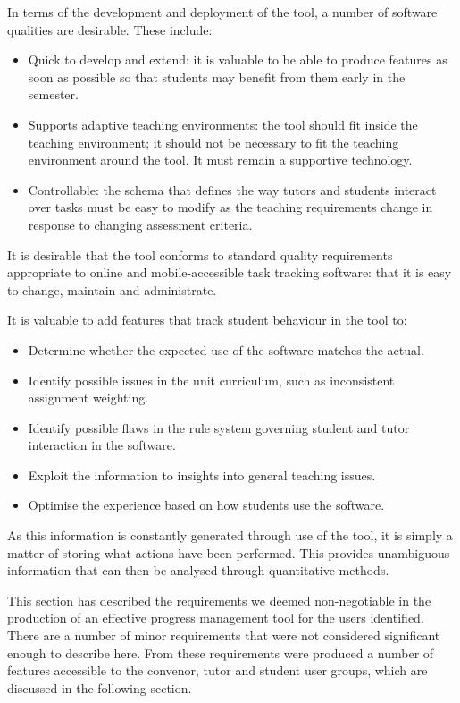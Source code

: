 In terms of the development and deployment of the tool, a number of software qualities are desirable. These include:
\begin{itemize}
  \item Quick to develop and extend: it is valuable to be able to produce features as soon as possible so that students may benefit from them early in the semester.
  \item Supports adaptive teaching environments: the tool should fit inside the teaching environment; it should not be necessary to fit the teaching environment around the tool. It must remain a supportive technology.
  \item Controllable: the schema that defines the way tutors and students interact over tasks must be easy to modify as the teaching requirements change in response to changing assessment criteria.
\end{itemize}
It is desirable that the tool conforms to standard quality requirements appropriate to online and mobile-accessible task tracking software: that it is easy to change, maintain and administrate.

It is valuable to add features that track student behaviour in the tool to:
\begin{itemize}
  \item Determine whether the expected use of the software matches the actual.
  \item Identify possible issues in the unit curriculum, such as inconsistent assignment weighting.
  \item Identify possible flaws in the rule system governing student and tutor interaction in the software.
  \item Exploit the information to insights into general teaching issues.
  \item Optimise the experience based on how students use the software.
\end{itemize}
As this information is constantly generated through use of the tool, it is simply a matter of storing what actions have been performed. This provides unambiguous information that can then be analysed through quantitative methods.

This section has described the requirements we deemed non-negotiable in the production of an effective progress management tool for the users identified. There are a number of minor requirements that were not considered significant enough to describe here. From these requirements were produced a number of features accessible to the convenor, tutor and student user groups, which are discussed in the following section.

